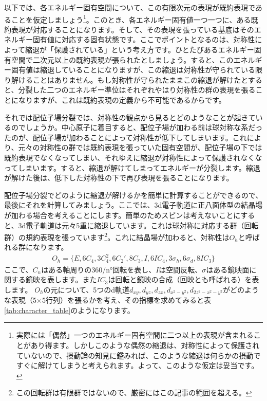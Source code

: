 \documentclass[uplatex,dvipdfmx,a4j]{jsarticle}
\begin{document}
以下では、各エネルギー固有空間について、この有限次元の表現が既約表現であることを仮定しましょう\footnote{実際には「偶然」一つのエネルギー固有空間に二つ以上の表現が含まれることがあり得ます。しかしこのような偶然の縮退は、対称性によって保護されていないので、摂動論の知見に鑑みれば、このような縮退は何らかの摂動ですぐに解けてしまうと考えられます。よって、このような仮定は妥当です。}。このとき、各エネルギー固有値一つ一つに、ある既約表現が対応することになります。そして、その表現を張っている基底はそのエネルギー固有値に対応する固有状態です。ここでポイントとなるのは、対称性によって縮退が「保護されている」という考え方です。ひとたびあるエネルギー固有空間で二次元以上の既約表現が張られたとしましょう。すると、このエネルギー固有値は縮退していることになりますが、この縮退は対称性が守られている限り解けることはありません。もし対称性が守られたままこの縮退が解けたとすると、分裂した二つのエネルギー準位はそれぞれやはり対称性の群の表現を張ることになりますが、これは既約表現の定義から不可能であるからです。

それでは配位子場分裂では、対称性の観点から見るとどのようなことが起きているのでしょうか。中心原子に着目すると、配位子場が加わる前は球対称な系だったのが、配位子場が加わることによって対称性が低下してしまいます。これにより、元々の対称性の群では既約表現を張っていた固有空間が、配位子場の下では既約表現でなくなってしまい、それゆえに縮退が対称性によって保護されなくなってしまいます。すると、縮退が解けてしまってエネルギーが分裂します。縮退が解けた後は、低下した対称性の下で再び表現を張ることになります。

配位子場分裂でどのように縮退が解けるかを簡単に計算することができるので、最後にそれを計算してみましょう。ここでは、3d電子軌道に正八面体型の結晶場が加わる場合を考えることにします。簡単のためスピンは考えないことにすると、3d電子軌道は元々5重に縮退しています。これは球対称に対応する群（回転群）の規約表現を張っています\footnote{この回転群は有限群ではないので、厳密にはこの記事の範囲を超える。}。これに結晶場が加わると、対称性は$O_h$と呼ばれる群になります。
\begin{align}
	O_h = \{ E, 6C_4, 3C_4^2, 6C_2', 8C_3, I, 6IC_4, 3\sigma_h, 6\sigma_d, 8IC_3 \}
\end{align}
ここで、$C_n$はある軸周りの360/n°回転を表し、$I$は空間反転、$\sigma$はある鏡映面に関する鏡映を表します。また$IC_3$は回転と鏡映の合成（回映とも呼ばれる）を表します。
$O_h$の元について、5つのd軌道$d_{xy}, d_{yz}, d_{zx}, d_{x^2-y^2}, d_{2z^2-x^2-y^2}$がどのような表現（5×5行列）を張るかを考え、その指標を求めてみると表\ref{tab:character_table}のようになります。
\end{document}
